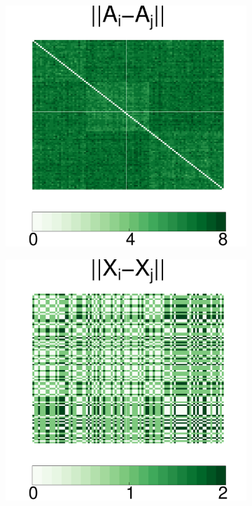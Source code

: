 \documentclass[12pt]{article}
\begin{document}
\begin{figure}[H]
\begin{subfigure}[b]{0.23\textwidth}
		\caption{}
		\label{fig:b}
	\end{subfigure}
	~ %
	\begin{subfigure}[b]{0.23\textwidth}
		\includegraphics[width=\textwidth]{../Figure/distA.pdf}
		\caption{}
		\label{fig:c}
	\end{subfigure}
	\begin{subfigure}[b]{0.23\textwidth}
		\includegraphics[width=\textwidth]{../Figure/distX.pdf}

\end{subfigure}
\end{figure}
\end{document}
